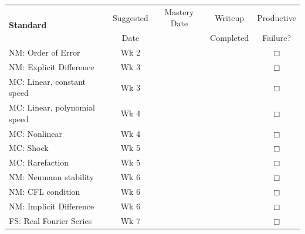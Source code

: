 \documentclass{article}
\newcommand{\checked}{\makebox[0pt][l]{$\checkmark$}$\square$}
\newcommand{\unchecked}{$\Box$}
\begin{document}

\begin{tabular}{|l|c|c|c|c} \cline{1-4}
\multirow{2}{5cm}{\textbf{Standard}} & Suggested & Mastery Date & Writeup & Productive  \\ 
& Date & & Completed & Failure? \\ \cline{1-4}
\multirow{2}{5cm}{NM: Order of Error} & \multirow{2}{1.5cm}{Wk 2} &&& \multirow{2}{.4cm}{\unchecked} \\ &&&& \\ \cline{1-4}
\multirow{2}{5cm}{NM: Explicit Difference} & \multirow{2}{1.5cm}{Wk 3} &&& \multirow{2}{.4cm}{\unchecked} \\ &&&& \\ \cline{1-4}
\multirow{2}{5cm}{MC: Linear, constant speed}  & \multirow{2}{1.5cm}{Wk 3}&&& \multirow{2}{.4cm}{\unchecked} \\ &&&& \\ \cline{1-4}
\multirow{2}{5cm}{MC: Linear, polynomial speed} & \multirow{2}{1.5cm}{Wk 4}&&& \multirow{2}{.4cm}{\unchecked} \\ &&&& \\ \cline{1-4}
\multirow{2}{5cm}{MC: Nonlinear} &\multirow{2}{1.5cm}{Wk 4}&&& \multirow{2}{.4cm}{\unchecked} \\ &&&& \\ \cline{1-4}
\multirow{2}{5cm}{MC: Shock} &\multirow{2}{1.5cm}{Wk 5}&&& \multirow{2}{.4cm}{\unchecked} \\ &&&& \\ \cline{1-4}
\multirow{2}{5cm}{MC: Rarefaction} & \multirow{2}{1.5cm}{Wk 5}&&& \multirow{2}{.4cm}{\unchecked} \\ &&&& \\ \cline{1-4}
\multirow{2}{5cm}{NM: Neumann stability} &\multirow{2}{1.5cm}{Wk 6}&&& \multirow{2}{.4cm}{\unchecked} \\ &&&& \\ \cline{1-4}
\multirow{2}{5cm}{NM: CFL condition} &\multirow{2}{1.5cm}{Wk 6}&&& \multirow{2}{.4cm}{\unchecked} \\ &&&& \\ \cline{1-4}
\multirow{2}{5cm}{NM: Implicit Difference} &\multirow{2}{1.5cm}{Wk 6}&&& \multirow{2}{.4cm}{\unchecked} \\ &&&& \\ \cline{1-4}
\multirow{2}{5cm}{FS: Real Fourier Series} & \multirow{2}{1.5cm}{Wk 7} &&& \multirow{2}{.4cm}{\unchecked} \\ &&&& \\ \cline{1-4}

\end{tabular}
\end{document}
